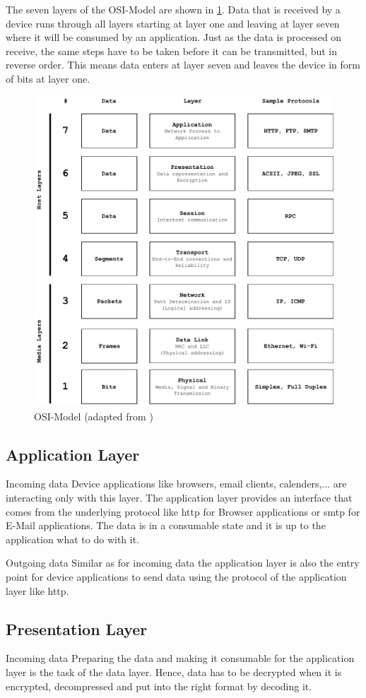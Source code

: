 The seven layers of the OSI-Model are shown in \cref{fig:osimodel}. Data that is received by a device runs through all layers starting at layer one and leaving at layer seven where it will be consumed by an application. Just as the data is processed on receive, the same steps have to be taken before it can be transmitted, but in reverse order. This means data enters at layer seven and leaves the device in form of bits at layer one.

\begin{figure}
\centering
\includegraphics[width=.5\textwidth]{graphics/osi-modell.pdf}
\caption{OSI-Model (adapted from \citet{wiki:osi-model})}
\label{fig:osimodel}
\end{figure}

\subsection{Application Layer}
Incoming data\newline
Device applications like browsers, email clients, calenders,... are interacting only with this layer. The application layer provides an interface that comes from the underlying protocol like \gls{http} for Browser applications or \gls{smtp} for E-Mail applications. The data is in a consumable state and it is up to the application what to do with it.

Outgoing data\newline
Similar as for incoming data the application layer is also the entry point for device applications to send data using the protocol of the application layer like \gls{http}. 


\subsection{Presentation Layer}
Incoming data\newline
Preparing the data and making it consumable for the application layer is the task of the data layer. 
Hence, data has to be decrypted when it is encrypted, decompressed and put into the right format by decoding it.

